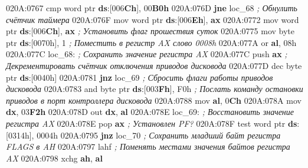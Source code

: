 \documentclass[
]{article}
\newenvironment{Shaded}{}{}
\newcommand{\BaseNTok}[1]{\textcolor[rgb]{0.25,0.63,0.44}{#1}}
\newcommand{\BuiltInTok}[1]{\textcolor[rgb]{0.00,0.50,0.00}{#1}}
\newcommand{\CommentTok}[1]{\textcolor[rgb]{0.38,0.63,0.69}{\textit{#1}}}
\newcommand{\ControlFlowTok}[1]{\textcolor[rgb]{0.00,0.44,0.13}{\textbf{#1}}}
\newcommand{\DataTypeTok}[1]{\textcolor[rgb]{0.56,0.13,0.00}{#1}}
\newcommand{\DecValTok}[1]{\textcolor[rgb]{0.25,0.63,0.44}{#1}}
\newcommand{\ErrorTok}[1]{\textcolor[rgb]{1.00,0.00,0.00}{\textbf{#1}}}
\newcommand{\KeywordTok}[1]{\textcolor[rgb]{0.00,0.44,0.13}{\textbf{#1}}}
\newcommand{\NormalTok}[1]{#1}
\newcommand{\OperatorTok}[1]{\textcolor[rgb]{0.40,0.40,0.40}{#1}}
\begin{document}
\begin{Shaded}
\begin{Highlighting}[]
\NormalTok{020A:0767 }\BuiltInTok{cmp} \DataTypeTok{word} \DataTypeTok{ptr} \KeywordTok{ds}\OperatorTok{:[}\DecValTok{006}\ErrorTok{Ch}\OperatorTok{],} \DecValTok{00}\ErrorTok{B0h}
\NormalTok{020A:076D }\ControlFlowTok{jne}\NormalTok{ loc\_68}
\CommentTok{; Обнулить счётчик таймера}
\NormalTok{020A:076F }\BuiltInTok{mov} \DataTypeTok{word} \DataTypeTok{ptr} \KeywordTok{ds}\OperatorTok{:[}\DecValTok{006}\ErrorTok{Eh}\OperatorTok{],} \KeywordTok{ax}
\NormalTok{020A:0772 }\BuiltInTok{mov} \DataTypeTok{word} \DataTypeTok{ptr} \KeywordTok{ds}\OperatorTok{:[}\DecValTok{006}\ErrorTok{Ch}\OperatorTok{],} \KeywordTok{ax}
\CommentTok{; Установить флаг прошествия суток}
\NormalTok{020A:0775 }\BuiltInTok{mov} \DataTypeTok{byte} \DataTypeTok{ptr} \KeywordTok{ds}\OperatorTok{:[}\BaseNTok{0070h}\OperatorTok{],} \DecValTok{1}
\CommentTok{; Поместить в регистр AX слово 0008h}
\NormalTok{020A:077A }\BuiltInTok{or} \KeywordTok{al}\OperatorTok{,} \BaseNTok{08h}
\NormalTok{020A:077C loc\_68}\OperatorTok{:}
\CommentTok{; Сохранить значение регистра AX}
\NormalTok{020A:077C }\BuiltInTok{push} \KeywordTok{ax}
\CommentTok{; Декрементировать счётчик отключения приводов дисковода}
\NormalTok{020A:077D }\BuiltInTok{dec} \DataTypeTok{byte} \DataTypeTok{ptr} \KeywordTok{ds}\OperatorTok{:[}\BaseNTok{0040h}\OperatorTok{]}
\NormalTok{020A:0781 }\ControlFlowTok{jnz}\NormalTok{ loc\_69}
\CommentTok{; Сбросить флаги работы приводов дисковода}
\NormalTok{020A:0783 }\BuiltInTok{and} \DataTypeTok{byte} \DataTypeTok{ptr} \KeywordTok{ds}\OperatorTok{:[}\DecValTok{003}\ErrorTok{Fh}\OperatorTok{],}\NormalTok{ F0h}
\CommentTok{; Послать команду остановки приводов в порт контроллера дисковода}
\NormalTok{020A:0788 }\BuiltInTok{mov} \KeywordTok{al}\OperatorTok{,} \DecValTok{0}\ErrorTok{Ch}
\NormalTok{020A:078A }\BuiltInTok{mov} \KeywordTok{dx}\OperatorTok{,} \DecValTok{03}\ErrorTok{F2h}
\NormalTok{020A:078D }\BuiltInTok{out} \KeywordTok{dx}\OperatorTok{,} \KeywordTok{al}
\NormalTok{020A:078E loc\_69}\OperatorTok{:}
\CommentTok{; Восстановить значение регистра AX}
\NormalTok{020A:078E }\BuiltInTok{pop} \KeywordTok{ax}
\CommentTok{; Установлен PF?}
\NormalTok{020A:078F }\BuiltInTok{test} \DataTypeTok{word} \DataTypeTok{ptr} \KeywordTok{ds}\OperatorTok{:[}\BaseNTok{0314h}\OperatorTok{],} \BaseNTok{0004h}
\NormalTok{020A:0795 }\ControlFlowTok{jnz}\NormalTok{ loc\_70}
\CommentTok{; Сохранить младший байт регистра FLAGS в AH}
\NormalTok{020A:0797 }\BuiltInTok{lahf}
\CommentTok{; Поменять местами значения байтов регистра AX}
\NormalTok{020A:0798 }\BuiltInTok{xchg} \KeywordTok{ah}\OperatorTok{,} \KeywordTok{al}

\end{Highlighting}
\end{Shaded}
\end{document}
